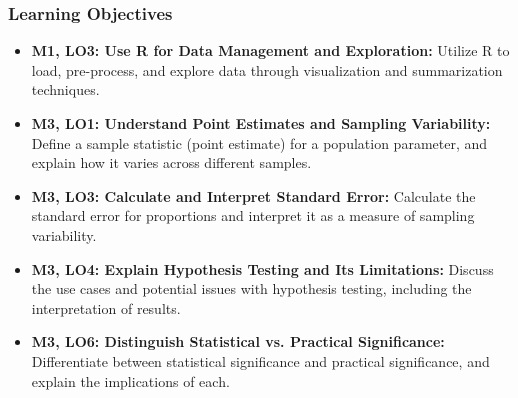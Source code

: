 \begin{frame}
    \frametitle{Learning Objectives}
    \begin{itemize}
        \item \textbf{M1, LO3: Use R for Data Management and Exploration:} Utilize R to load, pre-process, and explore data through visualization and summarization techniques.
        \item \textbf{M3, LO1: Understand Point Estimates and Sampling Variability:} Define a sample statistic (point estimate) for a population parameter, and explain how it varies across different samples.
        \item \textbf{M3, LO3: Calculate and Interpret Standard Error:} Calculate the standard error for proportions and interpret it as a measure of sampling variability.
        \item \textbf{M3, LO4: Explain Hypothesis Testing and Its Limitations:} Discuss the use cases and potential issues with hypothesis testing, including the interpretation of results.
        \item \textbf{M3, LO6: Distinguish Statistical vs. Practical Significance:} Differentiate between statistical significance and practical significance, and explain the implications of each.
    \end{itemize}
\end{frame}
    

